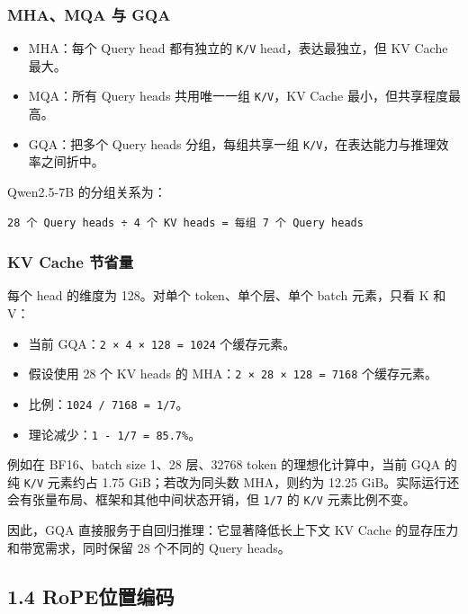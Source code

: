 \documentclass[UTF8,fontset=fandol,a4paper,11pt]{ctexart}
\providecommand{\tightlist}{\setlength{\itemsep}{0pt}\setlength{\parskip}{0pt}}
\begin{document}
\subsubsection{MHA、MQA 与 GQA}\label{mhamqa-ux4e0e-gqa}

\begin{itemize}
\tightlist
\item
  MHA：每个 Query head 都有独立的 {\nolinkurl{K/V}} head，表达最独立，但
  KV Cache 最大。
\item
  MQA：所有 Query heads 共用唯一一组 {\nolinkurl{K/V}，KV} Cache
  最小，但共享程度最高。
\item
  GQA：把多个 Query heads 分组，每组共享一组
  {\nolinkurl{K/V}，在表达能力与推理效率之间折中。}
\end{itemize}

Qwen2.5-7B 的分组关系为：

\begin{Verbatim}[breaklines,breakanywhere,fontsize=\small]
28 个 Query heads ÷ 4 个 KV heads = 每组 7 个 Query heads
\end{Verbatim}

\subsubsection{KV Cache 节省量}\label{kv-cache-ux8282ux7701ux91cf}

每个 head 的维度为 128。对单个 token、单个层、单个 batch 元素，只看 K 和
V：

\begin{itemize}
\tightlist
\item
  当前 GQA：\nolinkurl{2 × 4 × 128 = 1024} 个缓存元素。
\item
  假设使用 28 个 KV heads 的 MHA：\nolinkurl{2 × 28 × 128 = 7168}
  个缓存元素。
\item
  比例：\nolinkurl{1024 / 7168 = 1/7}。
\item
  理论减少：\nolinkurl{1 - 1/7 = 85.7%}。
\end{itemize}

例如在 BF16、batch size 1、28 层、32768 token 的理想化计算中，当前 GQA
的纯 {\nolinkurl{K/V}} 元素约占 1.75 GiB；若改为同头数 MHA，则约为 12.25
GiB。实际运行还会有张量布局、框架和其他中间状态开销，但 \nolinkurl{1/7}
的 {\nolinkurl{K/V}} 元素比例不变。

因此，GQA 直接服务于自回归推理：它显著降低长上下文 KV Cache
的显存压力和带宽需求，同时保留 28 个不同的 Query heads。

\subsection{1.4 RoPE位置编码}\label{ropeux4f4dux7f6eux7f16ux7801}
\end{document}
